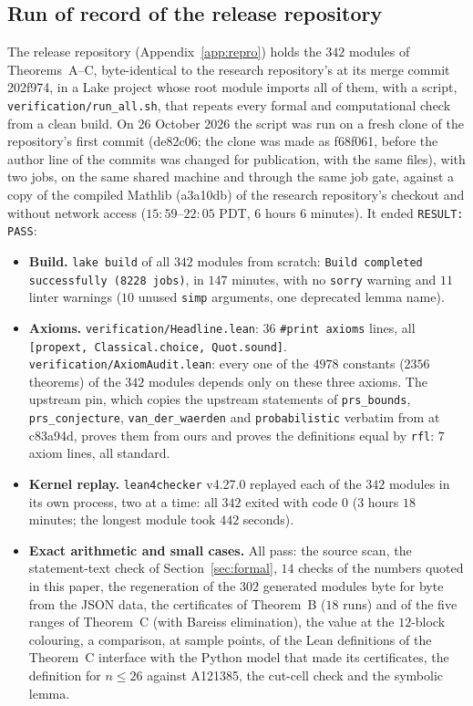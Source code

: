 \documentclass[11pt]{amsart}
\theoremstyle{remark}
\newcommand{\lean}[1]{\texttt{#1}}
\begin{document}
\subsection{Run of record of the release repository}\label{sec:record}
The release repository \cite{Artifact} (Appendix~\ref{app:repro}) holds the $342$ modules of Theorems~A--C, byte-identical to the research repository's at its merge commit 202f974, in a Lake project whose root module imports all of them, with a script, \texttt{verification/run\_all.sh}, that repeats every formal and computational check from a clean build. On 26 October 2026 the script was run on a fresh clone of the repository's first commit (de82c06; the clone was made as f68f061, before the author line of the commits was changed for publication, with the same files), with two jobs, on the same shared machine and through the same job gate, against a copy of the compiled Mathlib (a3a10db) of the research repository's checkout and without network access ($15{:}59$--$22{:}05$ PDT, $6$ hours $6$ minutes). It ended \texttt{RESULT: PASS}:
\begin{itemize}
\item \textbf{Build.} \texttt{lake build} of all $342$ modules from scratch: \texttt{Build completed successfully (8228 jobs)}, in $147$ minutes, with no \texttt{sorry} warning and $11$ linter warnings ($10$ unused \texttt{simp} arguments, one deprecated lemma name).
\item \textbf{Axioms.} \texttt{verification/Headline.lean}: $36$ \lean{\#print axioms} lines, all \lean{[propext, Classical.choice, Quot.sound]}. \texttt{verification/AxiomAudit.lean}: every one of the $4978$ constants ($2356$ theorems) of the $342$ modules depends only on these three axioms. The upstream pin, which copies the upstream statements of \lean{prs\_bounds}, \lean{prs\_conjecture}, \lean{van\_der\_waerden} and \lean{probabilistic} verbatim from \cite{FC} at c83a94d, proves them from ours and proves the definitions equal by \lean{rfl}: $7$ axiom lines, all standard.
\item \textbf{Kernel replay.} \texttt{lean4checker} v4.27.0 \cite{lean4checker} replayed each of the $342$ modules in its own process, two at a time: all $342$ exited with code $0$ ($3$ hours $18$ minutes; the longest module took $442$ seconds).
\item \textbf{Exact arithmetic and small cases.} All pass: the source scan, the statement-text check of Section~\ref{sec:formal}, $14$ checks of the numbers quoted in this paper, the regeneration of the $302$ generated modules byte for byte from the JSON data, the certificates of Theorem~B ($18$ runs) and of the five ranges of Theorem~C (with Bareiss elimination), the value at the $12$-block colouring, a comparison, at sample points, of the Lean definitions of the Theorem~C interface with the Python model that made its certificates, the definition for $n\le26$ against A121385, the cut-cell check and the symbolic lemma.
\end{itemize}
\end{document}
